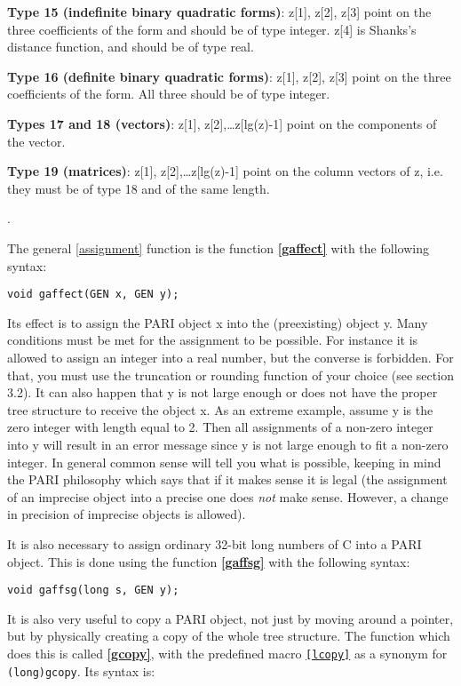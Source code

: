 {\bf Type 15 (indefinite binary quadratic forms)}: 
z[1], z[2], z[3] point on the three coefficients of the form and should
be of type integer. z[4] is Shanks's distance function, and should be of
type real.

{\bf Type 16 (definite binary quadratic forms)}: 
z[1], z[2], z[3] point on the three
coefficients of the form. All three should be of type integer.

{\bf Types 17 and 18 (vectors)}: 
z[1], z[2],\dots z[lg(z)-1] point on the components
of the vector.

{\bf Type 19 (matrices)}: 
z[1], z[2],\dots z[lg(z)-1] point on the column vectors
of z, i.e. they must be of type 18 and of the same length.

.

The general \ref{assignment} function is the function {\bf \ref{gaffect}} with
the following syntax:

{\tt void gaffect(GEN x, GEN y);}

Its effect is to assign the PARI object x into the (preexisting) object y.
Many conditions must be met for the assignment to be possible. For instance it is
allowed to assign an integer into a real number, but the converse is forbidden.
For that, you must use the truncation or rounding function of your choice
(see section 3.2). It can
also happen that y is not large enough or does not have the proper tree structure
to receive the object x. As an extreme example, assume y is the zero integer with
length equal to 2. Then all assignments of a non-zero integer into y will
result in an error message since y is not large enough to fit a non-zero integer.
In general common sense will tell you what is possible, keeping in mind the
PARI philosophy which says that if it makes sense it is legal (the assignment of
an imprecise object into a precise one does {\it not\/} make sense. However,
a change in precision of imprecise objects is allowed).

It is also necessary to assign ordinary 32-bit long numbers of C into a PARI
object. This is done using the function {\bf \ref{gaffsg}} with the following syntax:

{\tt void gaffsg(long s, GEN y);}

It is also very useful to copy a PARI object, not just by moving around a pointer,
but by physically creating a copy of the whole tree structure. The function
which does this is called {\bf \ref{gcopy}}, with the predefined macro 
{\tt \ref{lcopy}} as a synonym for {\tt (long)gcopy}. Its syntax is:

